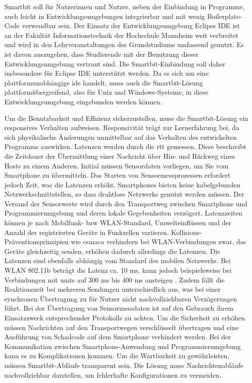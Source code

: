 \documentclass[11pt,a4paper]{report}
\begin{document}
Smartbit soll für Nutzerinnen und Nutzer, neben der Einbindung in Programme, auch leicht in Entwicklungsumgebungen integrierbar und mit wenig Boilerplate-Code verwendbar sein.
Der Einsatz der Entwicklungsumgebung Eclipse IDE \cite{eclipse-ide} ist an der Fakultät Informationstechnik der Hochschule Mannheim weit verbreitet und wird in den Lehrveranstaltungen des Grundstudiums umfassend genutzt.
Es ist davon auszugehen, dass Studierende mit der Benutzung dieser Entwicklungsumgebung vertraut sind.
Die Smartbit-Einbindung soll daher insbesondere für Eclipse IDE unterstützt werden.
Da es sich um eine plattformunabhängige \acrfull{ide} handelt, muss auch die Smartbit-Lösung plattformübergreifend, also für Unix und Windows-Systeme, in diese Entwicklungsumgebung eingebunden werden können.

Um die Benutzbarkeit und Effizienz sicherzustellen, muss die Smartbit-Lösung ein responsives Verhalten aufweisen.
Responsivität trägt zur Lernerfahrung bei, da sich physikalische Änderungen unmittelbar auf das Verhalten des entwickelten Programms auswirken.
Latenzen werden durch die \acrfull{rtt} gemessen.
Diese beschreibt die Zeitdauer der Übermittlung einer Nachricht über Hin- und Rückweg eines Hosts zu einem Anderen.
Initial müssen Sensordaten vorliegen, um Sie vom Smartphone zu übermitteln.
Das Starten von Sensormessprozessen erfordert jedoch Zeit, was die Latenzen erhöht. 
Smartphones bieten keine kabelgebunden Netzwerkschnittstellen, so dass drahtlose Netzwerke genutzt werden müssen.
Der Versand der Sensorwerte wird durch den Transportweg zwischen Smartphone und Programmierumgebung und deren lokale Gegebenheiten verzögert.
Latenzzeiten können je nach Mobilfunk- bzw WLAN-Standard, Umwelteinflüssen und der Anzahl der registrierten Geräte in Funkzellen variieren.
Kollisions-Präventionsprinzipien wie \acrfull{csmaca} verhindern bei WLAN-Verbindungen zwar, das Geräte gleichzeitig senden, erhöhen dadurch allerdings die Latenzen.
Die Latenzen sind ebenfalls abhängig vom Standard des mobilen Netzwerks.
Bei WLAN 802.11b beträgt die Latenz ca. 10 ms, kann jedoch beispielsweise bei Verbindungen mit \acrfull{umts} auf 300 ms bis 400 ms ansteigen \cite{network_latencies}.
Zudem fällt die Reaktionszeit bei mehreren Sendungen unterschiedlich aus, was bei einer synchronen Übertragung zu für Nutzer nicht nachvollziehbaren Verzögerungen führt.
Bei der Übertragung von Sensormessdaten ist auf den Gebrauch ihrem Einsatzzweck entsprechender Protokolle zu achten.
Um die Sicherheit zu erhöhen müssen Nachrichten auf den Transportwegen verschlüsselt übertragen und eine Ausführung von Schadcode auf dem Smartphone verhindert werden.
Bei der Kommunikation zwischen Smartphone-Anwendung und Programmierumgebung kann es zu Komplikationen kommen.
Um die Wartbarkeit zu gewährleisten, müssen Smartbit-Abläufe transparent sein.
Die Lösung muss Nachrichtenabläufe nachvollziehbar darstellen, um fehlerhafte Konfigurationen zu vermeiden.
\end{document}
